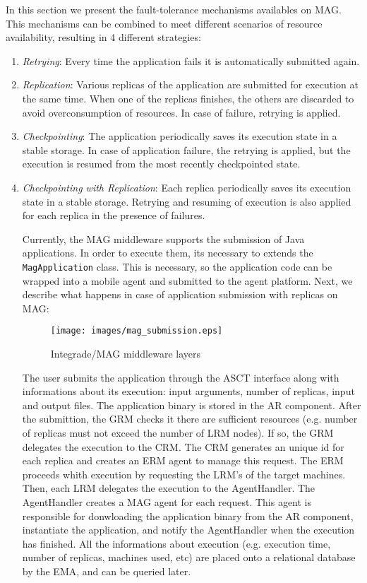 \documentclass[times, 10pt, twocolumn]{article}
\begin{document}
In this section we present the fault-tolerance mechanisms availables on MAG.
This mechanisms can be combined to meet different scenarios of resource
availability, resulting in 4 different strategies:

\begin{enumerate}
    \item \emph{Retrying}: Every time the application fails it is automatically submitted again.
   
    \item \emph{Replication}: Various replicas of the application are submitted
for execution at the same time. When one of the replicas finishes, the others
are discarded to avoid overconsumption of resources. In case of failure,
retrying is applied.
   
    \item \emph{Checkpointing}: The application periodically saves its execution
state in a stable storage. In case of application failure, the retrying is
applied, but the execution is resumed from the most recently checkpointed
state.
 
    \item \emph{Checkpointing with Replication}: Each replica periodically saves
its execution state in a stable storage. Retrying and resuming of execution is
also applied for each replica in the presence of failures.

Currently, the MAG middleware supports the submission of Java applications. In
order to execute them, its necessary to extends the {\tt MagApplication} class. This
is necessary, so the application code can be wrapped into a mobile agent and
submitted to the agent platform. Next, we describe what happens in case of
application submission with replicas on MAG:

\begin{figure}[th]
\centering \texttt{[image: images/mag\_submission.eps]}
\caption{Integrade/MAG middleware layers}
\label{fig:magarch}
\end{figure}

The user submits the application through the ASCT interface along with
informations about its execution: input arguments, number of replicas, input
and output files. The application binary is stored in the AR component. After
the submittion, the GRM checks it there are sufficient resources (e.g. number of
replicas must not exceed the number of LRM nodes). If so, the GRM delegates the
execution to the CRM. The CRM generates an unique id for each replica and
creates an ERM agent to manage this request. The ERM proceeds whith execution
by requesting the LRM's of the target machines. Then, each LRM delegates the
execution to the AgentHandler. The AgentHandler creates a MAG agent for each
request. This agent is responsible for donwloading the application binary from
the AR component, instantiate the application, and notify the AgentHandler when
the execution has finished. All the informations about execution (e.g.
execution time, number of replicas, machines used, etc) are placed onto a
relational database by the EMA, and can be queried later.


\end{enumerate}
\end{document}
